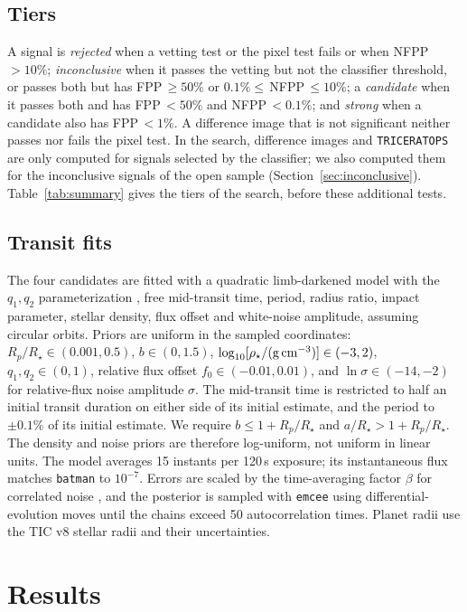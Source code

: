 \documentclass{aastex701}
\begin{document}
\subsection{Tiers}
A signal is \emph{rejected} when a vetting test or the pixel test fails or when NFPP\,$>10\%$;
\emph{inconclusive} when it passes the vetting but not the classifier threshold, or passes both but
has FPP\,$\geq 50\%$ or $0.1\% \leq$\,NFPP\,$\leq 10\%$; a \emph{candidate}
when it passes both and has FPP\,$<50\%$ and NFPP\,$<0.1\%$; and \emph{strong} when a candidate
also has FPP\,$<1\%$. A difference image that is not significant neither passes nor fails the
pixel test.
In the search, difference images and \texttt{TRICERATOPS} are only computed for signals selected by
the classifier; we also computed them for the inconclusive signals of the open sample
(Section~\ref{sec:inconclusive}). Table~\ref{tab:summary} gives the tiers of the search, before
these additional tests.

\subsection{Transit fits}
The four candidates are fitted with a quadratic limb-darkened model \citep{Mandel2002} with the
$q_1, q_2$ parameterization \citep{Kipping2013}, free mid-transit time, period, radius ratio, impact
parameter, stellar density, flux offset and white-noise amplitude, assuming circular orbits.
Priors are uniform in the sampled coordinates: $R_p/R_\star\in(0.001,0.5)$,
$b\in(0,1.5)$, $\log_{10}[\rho_\star/({\rm g\,cm^{-3}})]\in(-3,2)$,
$q_1, q_2\in(0,1)$, relative flux offset $f_0\in(-0.01,0.01)$, and
$\ln\sigma\in(-14,-2)$ for relative-flux noise amplitude $\sigma$.
The mid-transit time is restricted to half an initial transit duration on either side of its
initial estimate, and the period to $\pm0.1\%$ of its initial estimate. We require
$b\leq1+R_p/R_\star$ and $a/R_\star>1+R_p/R_\star$.
The density and noise priors are therefore log-uniform, not uniform in linear units. The
model averages 15 instants per 120\,s exposure; its instantaneous flux matches \texttt{batman}
\citep{Kreidberg2015} to $10^{-7}$. Errors are scaled by the time-averaging factor $\beta$ for
correlated noise \citep{Winn2008}, and the posterior is sampled with \texttt{emcee}
\citep{ForemanMackey2013} using differential-evolution moves until the chains exceed 50
autocorrelation times. Planet radii use the TIC v8 stellar radii and their uncertainties.

\section{Results}\label{sec:results}
\end{document}
